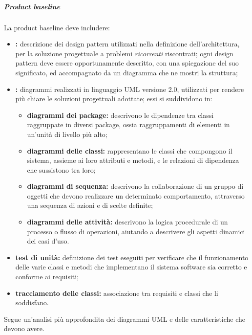 					\subparagraph{Product baseline}
						La product baseline deve includere:
						\begin{itemize}
							\item \textbf{:} descrizione dei design pattern utilizzati nella definizione dell'architettura, per la soluzione progettuale a problemi \textit{ricorrenti} riscontrati; ogni design pattern deve essere opportunamente descritto, con una spiegazione del suo significato, ed accompagnato da un diagramma che ne mostri la struttura;
							\item \textbf{:} diagrammi realizzati in linguaggio UML versione 2.0, utilizzati per rendere più chiare le soluzioni progettuali adottate; essi si suddividono in:
							\begin{itemize}
								\item \textbf{diagrammi dei package:} descrivono le dipendenze tra classi raggruppate in diversi package, ossia raggruppamenti di elementi in un'unità di livello più alto;
								\item \textbf{diagrammi delle classi:} rappresentano le classi che compongono il sistema, assieme ai loro attributi e metodi, e le relazioni di dipendenza che sussistono tra loro;
								\item \textbf{diagrammi di sequenza:} descrivono la collaborazione di un gruppo di oggetti che devono realizzare un determinato comportamento, attraverso una sequenza di azioni e di scelte definite;
								\item \textbf{diagrammi delle attività:} descrivono la logica procedurale di un processo o flusso di operazioni, aiutando a descrivere gli aspetti dinamici dei casi d'uso.
							\end{itemize}
							\item \textbf{test di unità:} definizione dei test eseguiti per verificare che il funzionamento delle varie classi e metodi che implementano il sistema software sia corretto e conforme ai requisiti;
							\item \textbf{tracciamento delle classi:} associazione tra requisiti e classi che li soddisfano.
						\end{itemize}

						Segue un'analisi più approfondita dei diagrammi UML e delle caratteristiche che devono avere.

